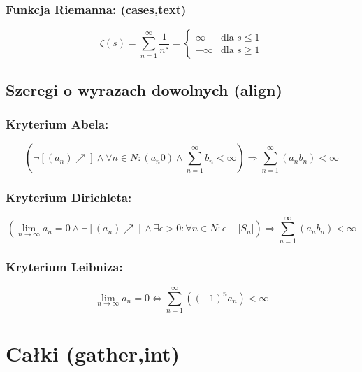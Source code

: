 \documentclass[12pt]{article}
\begin{document}
\subsubsection{Funkcja Riemanna: (cases,text)}

\begin{equation}
	\tag{0}
	\zeta (s) = \sum_{n=1}^\infty \frac{1}{n^s} = 
		\begin{cases}
			\infty & \text{dla } s \leq 1 \\
			-\infty & \text{dla } s \ge 1
		\end{cases}
\end{equation}

\subsection{Szeregi o wyrazach dowolnych (align)}

\subsubsection{Kryterium Abela:}

\begin{equation}
	\left(\lnot [(a_n) \nearrow] \land \forall{n \in N} : (a_n 0) \land \sum_{n=1}^\infty b_n < \infty \right) \Rightarrow \sum_{n=1}^\infty (a_n b_n) < \infty
\end{equation}

\subsubsection{Kryterium Dirichleta:}

\begin{equation}
	\left(\lim_{n \to \infty} a_n = 0 \land \lnot [(a_n) \nearrow] \land \exists{\epsilon > 0} : \forall{n \in N} : \epsilon - |S_n| \right) \Rightarrow \sum_{n=1}^\infty (a_n b_n) < \infty
\end{equation}

\subsubsection{Kryterium Leibniza:}

\begin{equation}
	\lim_{n \to \infty} a_n = 0 \iff \sum_{n=1}^\infty ((-1)^n a_n) < \infty
\end{equation}

\section{Całki (gather,int)}
\end{document}
